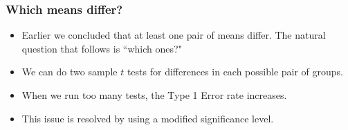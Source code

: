 \documentclass[slidestop,compress,mathserif]{beamer}
\begin{document}
\begin{frame}
\frametitle{Which means differ?}

\begin{itemize}

\item Earlier we concluded that at least one pair of means differ. The natural question that follows is ``which ones?"

\pause

\item We can do two sample $t$ tests for differences in each possible pair of groups.

\pause

\end{itemize}


\pause

\begin{itemize}

\item When we run too many tests, the Type 1 Error rate increases.

\item This issue is resolved by using a modified significance level.

\end{itemize}

\end{frame}










\end{document}

